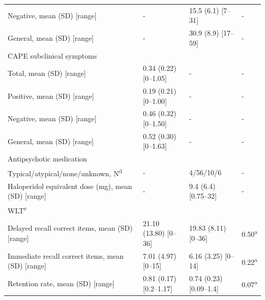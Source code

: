 \begin{refsection}
\begin{table}
\begin{tabular}{@{}llll@{}}
Negative, mean (SD) {[}range{]}                         & -                          & 15.5 (6.1) {[}7–31{]}      & -                 \\
General, mean (SD) {[}range{]}                          & -                          & 30.9 (8.9) {[}17–59{]}     & -                 \\
CAPE subclinical symptoms                               &                            &                            &                   \\
Total, mean (SD) {[}range{]}                            & 0.34 (0.22) {[}0–1.05{]}   & -                          & -                 \\
Positive, mean (SD) {[}range{]}                         & 0.19 (0.21) {[}0–1.00{]}   & -                          & -                 \\
Negative, mean (SD) {[}range{]}                         & 0.46 (0.32) {[}0–1.50{]}   & -                          & -                 \\
General, mean (SD) {[}range{]}                          & 0.52 (0.30) {[}0–1.63{]}   & -                          & -                 \\
Antipsychotic medication                                &                            &                            &                   \\
Typical/atypical/none/unknown, N\textsuperscript{d}                       & -                          & 4/56/10/6                  & -                 \\
Haloperidol equivalent dose (mg), mean (SD) {[}range{]} & -                          & 9.4 (6.4) {[}0.75–32{]}    & -                 \\
WLT\textsuperscript{e}                                                    &                            &                            &                   \\
Delayed recall correct items, mean (SD) {[}range{]}     & 21.10 (13.80) {[}0–36{]}   & 19.83 (8.11) {[}0–36{]}    & 0.50\textsuperscript{a}             \\
Immediate recall correct items, mean (SD) {[}range{]}   & 7.01 (4.97) {[}0–15{]}     & 6.16 (3.25) {[}0–14{]}     & 0.22\textsuperscript{a}             \\
Retention rate, mean (SD) {[}range{]}                   & 0.81 (0.17) {[}0.2–1.17{]} & 0.74 (0.23) {[}0.09–1.4{]} & 0.07\textsuperscript{a}             \\ \bottomrule
\end{tabular}

\end{table}
\end{refsection}
